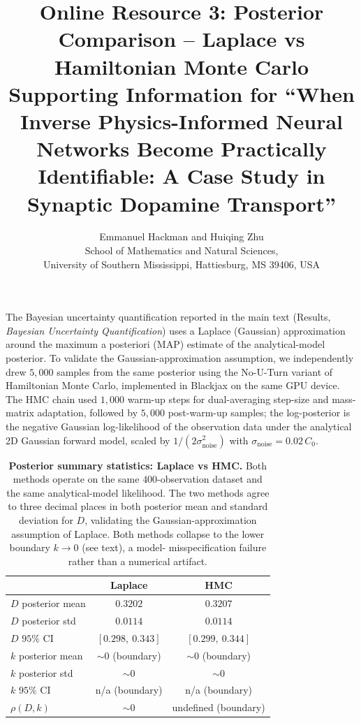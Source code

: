 \documentclass[12pt]{article}
\title{Online Resource 3: Posterior Comparison --
Laplace vs Hamiltonian Monte Carlo \\
\large Supporting Information for ``When Inverse
Physics-Informed Neural Networks Become Practically
Identifiable: A Case Study in Synaptic Dopamine Transport''}
\author{Emmanuel Hackman and Huiqing Zhu \\
School of Mathematics and Natural Sciences, \\
University of Southern Mississippi, Hattiesburg, MS 39406, USA}
\date{}
\begin{document}
\maketitle

The Bayesian uncertainty quantification reported in the main text
(Results, \emph{Bayesian Uncertainty Quantification}) uses a Laplace
(Gaussian) approximation around the maximum a posteriori (MAP)
estimate of the analytical-model posterior. To validate the
Gaussian-approximation assumption, we independently drew $5{,}000$
samples from the same posterior using the No-U-Turn variant of
Hamiltonian Monte Carlo, implemented in Blackjax on the same GPU
device. The HMC chain used $1{,}000$ warm-up steps for
dual-averaging step-size and mass-matrix adaptation, followed by
$5{,}000$ post-warm-up samples; the log-posterior is the negative
Gaussian log-likelihood of the observation data under the
analytical 2D Gaussian forward model, scaled by
$1/(2\sigma_{\mathrm{noise}}^2)$ with
$\sigma_{\mathrm{noise}} = 0.02\,C_0$.

\begin{table}[h!]
\centering
\caption{\textbf{Posterior summary statistics: Laplace vs HMC.}
Both methods operate on the same $400$-observation dataset and the
same analytical-model likelihood. The two methods agree to three
decimal places in both posterior mean and standard deviation for $D$,
validating the Gaussian-approximation assumption of Laplace. Both
methods collapse to the lower boundary $k \to 0$ (see text), a model-
misspecification failure rather than a numerical artifact.}
\label{tab:hmc_vs_laplace}
\begin{tabular}{lcc}
\toprule
                       & \textbf{Laplace}        & \textbf{HMC}             \\
\midrule
$D$ posterior mean     & $0.3202$                & $0.3207$                 \\
$D$ posterior std      & $0.0114$                & $0.0114$                 \\
$D$ $95\%$ CI          & $[0.298,\ 0.343]$       & $[0.299,\ 0.344]$        \\
$k$ posterior mean     & $\sim 0$ (boundary)     & $\sim 0$ (boundary)      \\
$k$ posterior std      & $\sim 0$                & $\sim 0$                 \\
$k$ $95\%$ CI          & n/a (boundary)          & n/a (boundary)           \\
$\rho(D, k)$           & $\sim 0$                & undefined (boundary)     \\
\bottomrule
\end{tabular}
\end{table}
\end{document}
